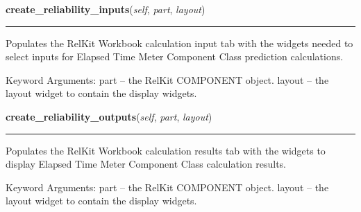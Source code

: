     \label{reliafree:meters:meter:ElapsedTime:create_reliability_inputs}

    \vspace{0.5ex}

\hspace{.8\funcindent}\begin{boxedminipage}{\funcwidth}

    \raggedright \textbf{create\_reliability\_inputs}(\textit{self}, \textit{part}, \textit{layout})

    \vspace{-1.5ex}

    \rule{\textwidth}{0.5\fboxrule}
\setlength{\parskip}{2ex}
    Populates the RelKit Workbook calculation input tab with the widgets
    needed to select inputs for Elapsed Time Meter Component Class 
    prediction calculations.

    Keyword Arguments: part   -- the RelKit COMPONENT object. layout -- 
    the layout widget to contain the display widgets.

\setlength{\parskip}{1ex}
    \end{boxedminipage}

    \label{reliafree:meters:meter:ElapsedTime:create_reliability_outputs}

    \vspace{0.5ex}

\hspace{.8\funcindent}\begin{boxedminipage}{\funcwidth}

    \raggedright \textbf{create\_reliability\_outputs}(\textit{self}, \textit{part}, \textit{layout})

    \vspace{-1.5ex}

    \rule{\textwidth}{0.5\fboxrule}
\setlength{\parskip}{2ex}
    Populates the RelKit Workbook calculation results tab with the 
    widgets to display Elapsed Time Meter Component Class calculation 
    results.

    Keyword Arguments: part   -- the RelKit COMPONENT object. layout -- 
    the layout widget to contain the display widgets.

\setlength{\parskip}{1ex}
    \end{boxedminipage}

